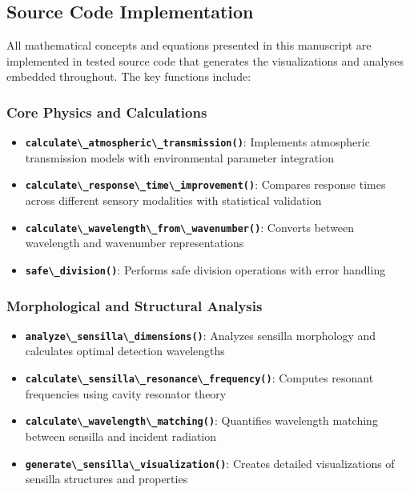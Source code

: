 \documentclass[
  13pt,
  a4paperpaper,
  12pt]{article}
\newcommand{\passthrough}[1]{#1}
\providecommand{\tightlist}{%
  \setlength{\itemsep}{0pt}\setlength{\parskip}{0pt}}
\begin{document}
\subsection{Source Code
Implementation}\label{source-code-implementation}

All mathematical concepts and equations presented in this manuscript are
implemented in tested source code that generates the visualizations and
analyses embedded throughout. The key functions include:

\subsubsection{Core Physics and
Calculations}\label{core-physics-and-calculations}

\begin{itemize}
\tightlist
\item
  \textbf{\passthrough{\lstinline!calculate\_atmospheric\_transmission()!}}:
  Implements atmospheric transmission models with environmental
  parameter integration
\item
  \textbf{\passthrough{\lstinline!calculate\_response\_time\_improvement()!}}:
  Compares response times across different sensory modalities with
  statistical validation
\item
  \textbf{\passthrough{\lstinline!calculate\_wavelength\_from\_wavenumber()!}}:
  Converts between wavelength and wavenumber representations
\item
  \textbf{\passthrough{\lstinline!safe\_division()!}}: Performs safe
  division operations with error handling
\end{itemize}

\subsubsection{Morphological and Structural
Analysis}\label{morphological-and-structural-analysis}

\begin{itemize}
\tightlist
\item
  \textbf{\passthrough{\lstinline!analyze\_sensilla\_dimensions()!}}:
  Analyzes sensilla morphology and calculates optimal detection
  wavelengths
\item
  \textbf{\passthrough{\lstinline!calculate\_sensilla\_resonance\_frequency()!}}:
  Computes resonant frequencies using cavity resonator theory
\item
  \textbf{\passthrough{\lstinline!calculate\_wavelength\_matching()!}}:
  Quantifies wavelength matching between sensilla and incident radiation
\item
  \textbf{\passthrough{\lstinline!generate\_sensilla\_visualization()!}}:
  Creates detailed visualizations of sensilla structures and properties
\end{itemize}
\end{document}
